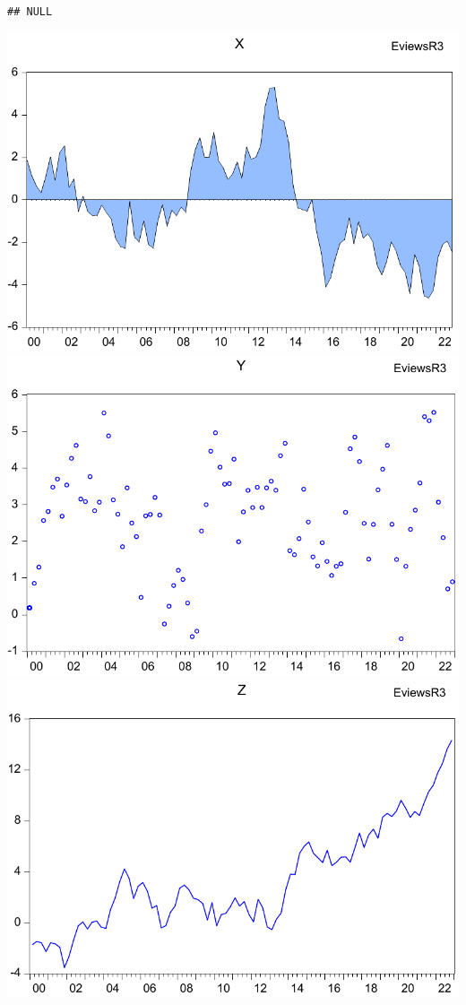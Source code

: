 \documentclass[
]{article}
\newenvironment{Shaded}{\begin{snugshade}}{\end{snugshade}}
\newcommand{\CommentTok}[1]{\textcolor[rgb]{0.56,0.35,0.01}{\textit{#1}}}
\newcommand{\ErrorTok}[1]{\textcolor[rgb]{0.64,0.00,0.00}{\textbf{#1}}}
\newcommand{\SpecialCharTok}[1]{\textcolor[rgb]{0.00,0.00,0.00}{#1}}
\begin{document}
\begin{verbatim}
## NULL
\end{verbatim}

\begin{Shaded}
\end{Shaded}

\begin{center}\includegraphics[width=0.2\linewidth,angle=90]{test_files/figure-latex//import1-EviewsR3-GRAPH1} \includegraphics[width=0.2\linewidth,angle=90]{test_files/figure-latex//import1-EviewsR3-GRAPH2} \includegraphics[width=0.2\linewidth,angle=90]{test_files/figure-latex//import1-EviewsR3-GRAPH3} \end{center}
\end{document}
